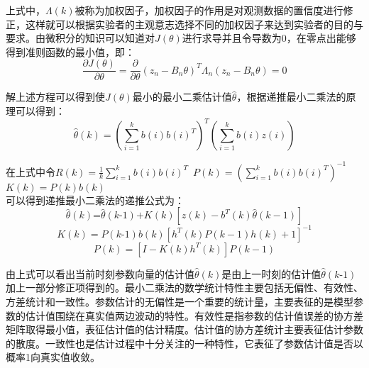 上式中，$\Lambda \left( k \right)$被称为加权因子，加权因子的作用是对观测数据的置信度进行修正，这样就可以根据实验者的主观意志选择不同的加权因子来达到实验者的目的与要求。由微积分的知识可以知道对$J\left( \theta  \right)$进行求导并且令导数为0，在零点出能够得到准则函数的最小值，即：
\begin{equation}
\frac{\partial J\left( \theta  \right)}{\partial \theta }=\frac{\partial }{\partial \theta }{{\left( {{z}_{n}}-{{B}_{n}}\theta  \right)}^{T}}{{\Lambda }_{n}}\left( {{z}_{n}}-{{B}_{n}}\theta  \right)=0
\end{equation}

解上述方程可以得到使$J\left( \theta  \right)$最小的最小二乘估计值$\hat{\theta }$，根据递推最小二乘法的原理可以得到：
\begin{equation}
\hat{\theta }\left( k \right)={{\left( \sum\limits_{i=1}^{k}{b\left( i \right)b{{\left( i \right)}^{T}}} \right)}^{T}}\left( \sum\limits_{i=1}^{k}{b\left( i \right)z\left( i \right)} \right)
\end{equation}

在上式中令$R\left( k \right)=\frac{1}{k}\sum\limits_{i=1}^{k}{b\left( i \right)b{{\left( i \right)}^{T}}}$~$P\left( k \right)={{\left( \sum\limits_{i=1}^{k}{b\left( i \right)b{{\left( i \right)}^{T}}} \right)}^{-1}}$~$K\left( k \right)=P\left( k \right)b\left( k \right)$\\可以得到递推最小二乘法的递推公式为：
\begin{equation}
\hat{\theta }\left( k \right)\text{=}\hat{\theta }\left( k\text{-}1 \right)\text{+}K\left( k \right)\left[ z\left( k \right)-{{b}^{T}}\left( k \right)\hat{\theta }\left( k-1 \right) \right]
\end{equation}
\begin{equation}
K\left( k \right)=P\left( k\text{-}1 \right)b\left( k \right){{\left[ {{h}^{T}}\left( k \right)P\left( k-1 \right)h\left( k \right)+1 \right]}^{-1}}
\end{equation}
\begin{equation}
P\left( k \right)=\left[ I-K\left( k \right){{h}^{T}}\left( k \right) \right]P\left( k-1 \right)
\end{equation}

由上式可以看出当前时刻参数向量的估计值$\hat{\theta }\left( k \right)$是由上一时刻的估计值$\hat{\theta }\left( k\text{-}1 \right)$\\加上一部分修正项得到的。最小二乘法的数学统计特性主要包括无偏性、有效性、方差统计和一致性。参数估计的无偏性是一个重要的统计量，主要表征的是模型参数的估计值围绕在真实值两边波动的特性。有效性是指参数的估计值误差的协方差矩阵取得最小值，表征估计值的估计精度。估计值的协方差统计主要表征估计参数的散度。一致性也是估计过程中十分关注的一种特性，它表征了参数估计值是否以概率1向真实值收敛。
